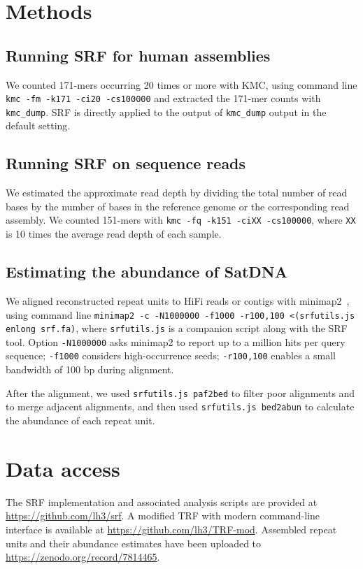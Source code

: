 \documentclass{bioinfo}
\begin{document}
\section{Methods}

\subsection{Running SRF for human assemblies}

We counted 171-mers occurring 20 times or more with KMC, using command line
{\tt kmc -fm -k171 -ci20 -cs100000} and extracted the 171-mer counts with
{\tt kmc\_dump}. SRF is directly applied to the output of {\tt kmc\_dump}
output in the default setting.

\subsection{Running SRF on sequence reads}

We estimated the approximate read depth by dividing the total number of read
bases by the number of bases in the reference genome or the corresponding
read assembly. We counted 151-mers with {\tt kmc -fq -k151 -ciXX -cs100000},
where {\tt XX} is 10 times the average read depth of each sample.

\subsection{Estimating the abundance of SatDNA}

We aligned reconstructed repeat units to HiFi reads or contigs with
minimap2~\citep{Li:2018ab}, using command line {\tt minimap2 -c -N1000000
-f1000 -r100,100 <(srfutils.js enlong srf.fa)}, where {\tt srfutils.js} is a
companion script along with the SRF tool. Option {\tt -N1000000} asks minimap2
to report up to a million hits per query sequence; {\tt -f1000} considers
high-occurrence seeds; {\tt -r100,100} enables a small bandwidth of 100 bp
during alignment.

After the alignment, we used {\tt srfutils.js paf2bed} to filter poor
alignments and to merge adjacent alignments, and then used {\tt srfutils.js
bed2abun} to calculate the abundance of each repeat unit.

\section{Data access}

The SRF implementation and associated analysis scripts are provided at
\href{https://github.com/lh3/srf}{https://github.com/lh3/srf}. A modified TRF
with modern command-line interface is available at
\href{https://github.com/lh3/TRF-mod}{https://github.com/lh3/TRF-mod}.
Assembled repeat units and their abundance estimates have been uploaded to
\href{https://zenodo.org/record/7814465}{https://zenodo.org/record/7814465}.
\end{document}
